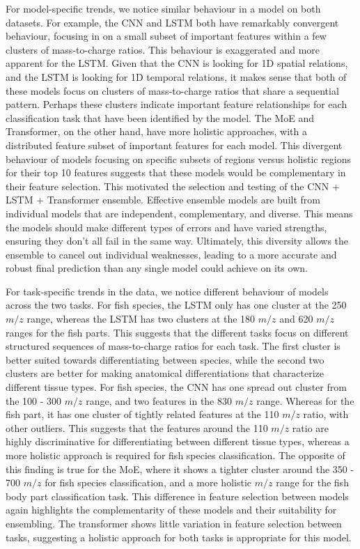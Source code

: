 For model-specific trends, we notice similar behaviour in a model on both datasets. For example, the CNN and LSTM both have remarkably convergent behaviour, focusing in on a small subset of important features within a few clusters of mass-to-charge ratios. This behaviour is exaggerated and more apparent for the LSTM. Given that the CNN is looking for 1D spatial relations, and the LSTM is looking for 1D temporal relations, it makes sense that both of these models focus on clusters of mass-to-charge ratios that share a sequential pattern. Perhaps these clusters indicate important feature relationships for each classification task that have been identified by the model. The MoE and Transformer, on the other hand, have more holistic approaches, with a distributed feature subset of important features for each model. This divergent behaviour of models focusing on specific subsets of regions versus holistic regions for their top 10 features suggests that these models would be complementary in their feature selection. This motivated the selection and testing of the CNN + LSTM + Transformer ensemble. Effective ensemble models are built from individual models that are independent, complementary, and diverse. This means the models should make different types of errors and have varied strengths, ensuring they don't all fail in the same way. Ultimately, this diversity allows the ensemble to cancel out individual weaknesses, leading to a more accurate and robust final prediction than any single model could achieve on its own.

For task-specific trends in the data, we notice different behaviour of models across the two tasks. For fish species, the LSTM only has one cluster at the 250 $m/z$ range, whereas the LSTM has two clusters at the 180 $m/z$ and 620 $m/z$ ranges for the fish parts. This suggests that the different tasks focus on different structured sequences of mass-to-charge ratios for each task. The first cluster is better suited towards differentiating between species, while the second two clusters are better for making anatomical differentiations that characterize different tissue types. For fish species, the CNN has one spread out cluster from the 100 - 300 $m/z$ range, and two features in the 830 $m/z$ range. Whereas for the fish part, it has one cluster of tightly related features at the 110 $m/z$ ratio, with other outliers. This suggests that the features around the 110 $m/z$ ratio are highly discriminative for differentiating between different tissue types, whereas a more holistic approach is required for fish species classification. The opposite of this finding is true for the MoE, where it shows a tighter cluster around the 350 - 700 $m/z$ for fish species classification, and a more holistic $m/z$ range for the fish body part classification task. This difference in feature selection between models again highlights the complementarity of these models and their suitability for ensembling. The transformer shows little variation in feature selection between tasks, suggesting a holistic approach for both tasks is appropriate for this model.

